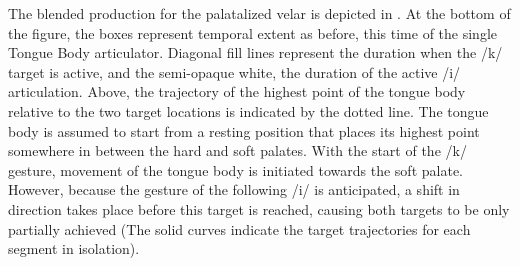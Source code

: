 The blended production for the palatalized velar is depicted in . 
At the bottom of the figure, the boxes represent
temporal extent as before, this time of the single Tongue Body articulator.
Diagonal fill lines represent the duration when the {/k/}
target is active, and the semi-opaque white, the duration of the active
{/i/} articulation. Above, the trajectory of the highest
point of the tongue body relative to the two target locations is indicated
by the dotted line. The tongue body is assumed to start from a resting
position that places its highest point somewhere in between the hard
and soft palates. With the start of the {/k/} gesture, movement
of the tongue body is initiated towards the soft palate. However,
because the gesture of the following {/i/} is anticipated,
a shift in direction takes place before this target is reached, causing
both targets to be only partially achieved (The solid curves indicate
the target trajectories for each segment in isolation). 

